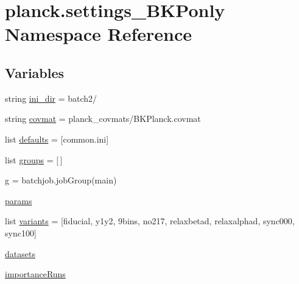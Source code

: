 \hypertarget{namespaceplanck_1_1settings__BKPonly}{}\section{planck.\+settings\+\_\+\+B\+K\+Ponly Namespace Reference}
\label{namespaceplanck_1_1settings__BKPonly}
\subsection*{Variables}
\begin{DoxyCompactItemize}
\item 
string \mbox{\hyperlink{namespaceplanck_1_1settings__BKPonly_af9d375b6cd3f49492f07e6ca40958ffa}{ini\+\_\+dir}} = \textquotesingle{}batch2/\textquotesingle{}
\item 
string \mbox{\hyperlink{namespaceplanck_1_1settings__BKPonly_a950b52d628c338ae89b207f59a2e92d8}{covmat}} = \textquotesingle{}planck\+\_\+covmats/B\+K\+Planck.\+covmat\textquotesingle{}
\item 
list \mbox{\hyperlink{namespaceplanck_1_1settings__BKPonly_a5b1a513a4641f8ba4b4b8d7e0733d580}{defaults}} = \mbox{[}\textquotesingle{}common.\+ini\textquotesingle{}\mbox{]}
\item 
list \mbox{\hyperlink{namespaceplanck_1_1settings__BKPonly_a99269d84011b65a78e7623155b623bcd}{groups}} = \mbox{[}$\,$\mbox{]}
\item 
\mbox{\hyperlink{namespaceplanck_1_1settings__BKPonly_ae986c7fad30b1c9e472bcf72783e4499}{g}} = batchjob.\+job\+Group(\textquotesingle{}main\textquotesingle{})
\item 
\mbox{\hyperlink{namespaceplanck_1_1settings__BKPonly_a9c09a6b1cf03d37a5f78096a7447f963}{params}}
\item 
list \mbox{\hyperlink{namespaceplanck_1_1settings__BKPonly_a964481efb64709caa1b21ca8f046eb2d}{variants}} = \mbox{[}\textquotesingle{}fiducial\textquotesingle{}, \textquotesingle{}y1y2\textquotesingle{}, \textquotesingle{}9bins\textquotesingle{}, \textquotesingle{}no217\textquotesingle{}, \textquotesingle{}relaxbetad\textquotesingle{}, \textquotesingle{}relaxalphad\textquotesingle{}, \textquotesingle{}sync000\textquotesingle{}, \textquotesingle{}sync100\textquotesingle{}\mbox{]}
\item 
\mbox{\hyperlink{namespaceplanck_1_1settings__BKPonly_ac300a64404b813fc38acaef396b75f69}{datasets}}
\item 
\mbox{\hyperlink{namespaceplanck_1_1settings__BKPonly_ac1dcbd7f8b8afa1010f1f7c0b4560b9f}{importance\+Runs}}
\end{DoxyCompactItemize}


